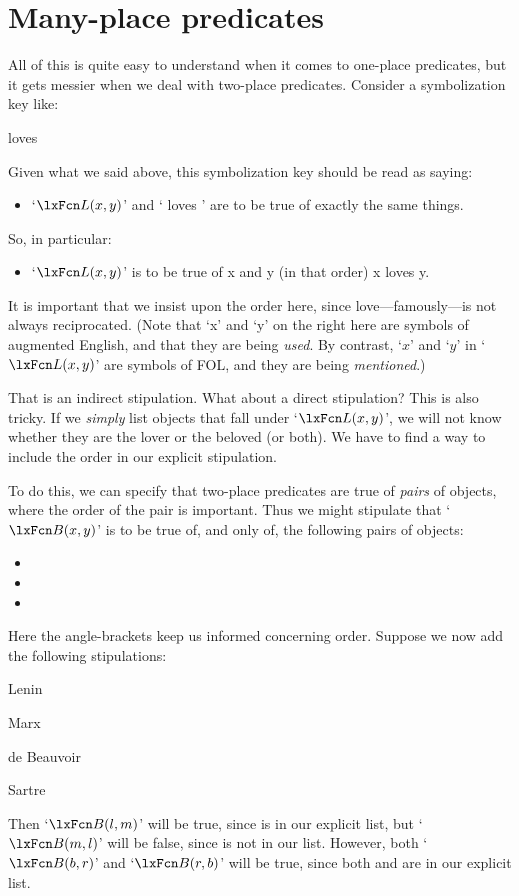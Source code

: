 \section{Many-place predicates}
All of this is quite easy to understand when it comes to one-place predicates, but it gets messier when we deal with two-place predicates. Consider a symbolization key like:
	\begin{ekey}
		\item[\atom{L}{x,y}]  loves 
	\end{ekey}
Given what we said above, this symbolization key should be read as saying:
	\begin{itemize}
		\item `$\atom{L}{x,y}$' and ` loves ' are to be true of exactly the same things.
	\end{itemize}
So, in particular:
	\begin{itemize}
		\item `$\atom{L}{x,y}$' is to be true of x and y (in that order) \ifeff{} x loves y.
	\end{itemize}
It is important that we insist upon the order here, since love---famously---is not always reciprocated. (Note that `x' and `y' on the right here are symbols of augmented English, and that they are being \emph{used}. By contrast, `$x$' and `$y$' in `$\atom{L}{x,y}$' are symbols of FOL, and they are being \emph{mentioned}.)

That is an indirect stipulation. What about a direct stipulation? This is also tricky. If we \emph{simply} list objects that fall under `$\atom{L}{x,y}$', we will not know whether they are the lover or the beloved (or both). We have to find a way to include the order in our explicit stipulation.

To do this, we can specify that two-place predicates are true of \emph{pairs} of objects, where the order of the pair is important. Thus we might stipulate that `$\atom{B}{x,y}$' is to be true of, and only of, the following pairs of objects:
	\begin{itemize}
		\item \ntuple{\text{Lenin}, \text{Marx}}
		\item \ntuple{\text{de Beauvoir}, \text{Sartre}}
		\item \ntuple{\text{Sartre}, \text{de Beauvoir}}
	\end{itemize}
Here the angle-brackets keep us informed concerning order. Suppose we now add the following stipulations:
	\begin{ekey}
		\item[l] Lenin
		\item[m] Marx
		\item[b] de Beauvoir
		\item[r] Sartre
	\end{ekey}
Then `$\atom{B}{l,m}$' will be true, since  is in our explicit list, but `$\atom{B}{m,l}$' will be false, since  is not in our list. However, both `$\atom{B}{b,r}$' and `$\atom{B}{r,b}$' will be true, since both  and  are in our explicit list.

